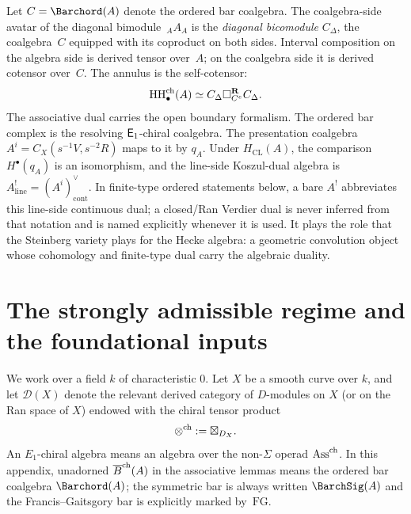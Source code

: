 Let $C = \Barchord(A)$ denote the ordered bar coalgebra.
The coalgebra-side avatar of the diagonal bimodule~${}_A A_A$
is the \emph{diagonal bicomodule} $C_\Delta$, the coalgebra~$C$
equipped with its coproduct on both sides.
Interval composition on the algebra side is derived tensor over~$A$;
on the coalgebra side it is derived cotensor over~$C$.
The annulus is the self-cotensor:
\[
\operatorname{HH}^{\mathrm{ch}}_\bullet(A)\simeq C_\Delta \square_{C^e}^{\mathbf R} C_\Delta.
\]
The associative dual carries the open boundary formalism.
The ordered bar complex is the resolving $\mathsf{E}_1$-chiral coalgebra.
The presentation coalgebra $A^i=C_X(s^{-1}V,s^{-2}R)$ maps to it by
$q_A$.  Under $H_{\mathrm{CL}}(A)$, the comparison
$H^\bullet(q_A)$ is an isomorphism, and the line-side Koszul-dual algebra is
$A^!_{\mathrm{line}}=(A^i)^\vee_{\mathrm{cont}}$.
In finite-type ordered statements below, a bare $A^!$ abbreviates this
line-side continuous dual; a closed/Ran Verdier dual is never inferred
from that notation and is named explicitly whenever it is used.
It plays the role that the Steinberg variety plays for the
Hecke algebra: a geometric convolution object whose cohomology
and finite-type dual carry the algebraic duality.

\section{The strongly admissible regime and the foundational inputs}
\label{sec:setup}

We work over a field $k$ of characteristic $0$. Let $X$ be a smooth curve over $k$, and let
$\mathcal D(X)$ denote the relevant derived category of $D$-modules on $X$ (or on the Ran space of
$X$) endowed with the chiral tensor product
\[
\mathbin{\otimes^{\mathrm{ch}}} := \boxtimes_{D_X}.
\]
An $E_1$-chiral algebra means an algebra over the non-$\Sigma$ operad $\mathrm{Ass}^{\mathrm{ch}}$.
In this appendix, unadorned $\overline{B}^{\mathrm{ch}}(A)$ in the associative lemmas means
the ordered bar coalgebra $\Barchord(A)$; the symmetric bar is always
written $\BarchSig(A)$ and the Francis--Gaitsgory bar is explicitly
marked by~$\mathrm{FG}$.

